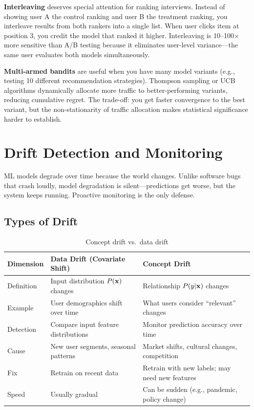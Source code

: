 \textbf{Interleaving} deserves special attention for ranking interviews. Instead of showing user A the control ranking and user B the treatment ranking, you interleave results from both rankers into a single list. When user clicks item at position 3, you credit the model that ranked it higher. Interleaving is 10--100$\times$ more sensitive than A/B testing because it eliminates user-level variance---the same user evaluates both models simultaneously.

\textbf{Multi-armed bandits} are useful when you have many model variants (e.g., testing 10 different recommendation strategies). Thompson sampling or UCB algorithms dynamically allocate more traffic to better-performing variants, reducing cumulative regret. The trade-off: you get faster convergence to the best variant, but the non-stationarity of traffic allocation makes statistical significance harder to establish.

\section{Drift Detection and Monitoring}
\label{sec:drift_monitoring}

ML models degrade over time because the world changes. Unlike software bugs that crash loudly, model degradation is silent---predictions get worse, but the system keeps running. Proactive monitoring is the only defense.

\subsection{Types of Drift}

\begin{table}[H]
\centering
\caption{Concept drift vs.\ data drift}
\begin{tabularx}{\textwidth}{lXX}
\toprule
\textbf{Dimension} & \textbf{Data Drift (Covariate Shift)} & \textbf{Concept Drift} \\
\midrule
Definition & Input distribution $P(\mathbf{x})$ changes & Relationship $P(y|\mathbf{x})$ changes \\
Example & User demographics shift over time & What users consider ``relevant'' changes \\
Detection & Compare input feature distributions & Monitor prediction accuracy over time \\
Cause & New user segments, seasonal patterns & Market shifts, cultural changes, competition \\
Fix & Retrain on recent data & Retrain with new labels; may need new features \\
Speed & Usually gradual & Can be sudden (e.g., pandemic, policy change) \\
\bottomrule
\end{tabularx}
\end{table}

